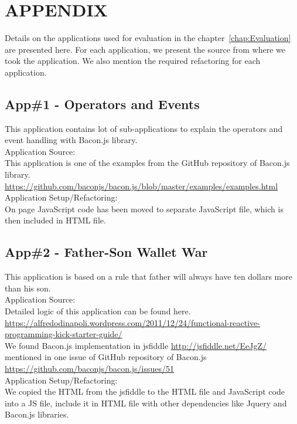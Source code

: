 \chapter{APPENDIX} \label{chap:Appendix}
Details on the applications used for evaluation in the chapter~\ref{chap:Evaluation} are presented here. For each application, we present the source from where we took the application. We also mention the required refactoring for each application.
\section{App\#1 - Operators and Events}
This application contains lot of sub-applications to explain the operators and event handling with Bacon.js library.\\
Application Source:\\ 
This application is one of the examples from the GitHub repository of Bacon.js library.\\
\url{https://github.com/baconjs/bacon.js/blob/master/examples/examples.html}\\
Application Setup/Refactoring: \\
On page JavaScript code has been moved to separate JavaScript file, which is then included in HTML file.

\section{App\#2 - Father-Son Wallet War}
This application is based on a rule that father will always have ten dollars more than his son.\\
Application Source:\\ 
Detailed logic of this application can be found here.\\ \url{https://alfredodinapoli.wordpress.com/2011/12/24/functional-reactive-programming-kick-starter-guide/}\\
We found Bacon.js implementation in jsfiddle \url{http://jsfiddle.net/EeJgZ/} mentioned in one issue of GitHub repository of Bacon.js\\
\url{https://github.com/baconjs/bacon.js/issues/51}\\
Application Setup/Refactoring: \\
We copied the HTML from the jsfiddle to the HTML file and JavaScript code into a JS file, include it in HTML file with other dependencies like Jquery and Bacon.js libraries.
